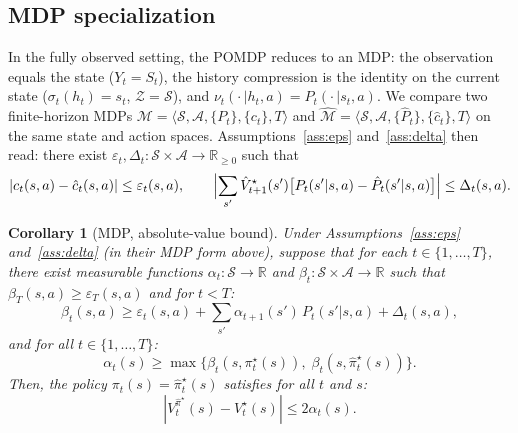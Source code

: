 \documentclass[10pt]{article}
\newtheorem{corollary}{Corollary}
\theoremstyle{definition}
\begin{document}
\subsection*{MDP specialization}

In the fully observed setting, the POMDP reduces to an MDP: the
observation equals the state ($Y_t = S_t$), the history compression is
the identity on the current state ($\sigma_t(h_t) = s_t$,
$\mathcal{Z} = \mathcal{S}$), and
$\nu_t(\cdot\,|h_t, a) = P_t(\cdot\,|s_t, a)$. We compare two
finite-horizon MDPs $\mathcal{M} = \langle \mathcal{S}, \mathcal{A},
\{P_t\}, \{c_t\}, T\rangle$ and $\hat{\mathcal{M}} = \langle
\mathcal{S}, \mathcal{A}, \{\hat P_t\}, \{\hat c_t\}, T\rangle$ on the
same state and action spaces. Assumptions~\ref{ass:eps}
and~\ref{ass:delta} then read: there exist
$\varepsilon_t, \Delta_t : \mathcal{S} \times \mathcal{A} \to
\mathbb{R}_{\ge 0}$ such that
\[
|c_t(s,a) - \hat c_t(s,a)| \le \varepsilon_t(s,a),
\qquad
\Bigl|\sum_{s'} \hat V^\star_{t+1}(s')
\bigl[P_t(s'|s,a) - \hat P_t(s'|s,a)\bigr]\Bigr| \le \Delta_t(s,a).
\]

\begin{corollary}[MDP, absolute-value bound]\label{cor:abs-mdp}
Under Assumptions~\ref{ass:eps} and~\ref{ass:delta} (in their MDP form
above), suppose that for each $t \in \{1, \dots, T\}$, there exist
measurable functions $\alpha_t : \mathcal{S} \to \mathbb{R}$ and
$\beta_t : \mathcal{S} \times \mathcal{A} \to \mathbb{R}$ such that
$\beta_T(s,a) \ge \varepsilon_T(s,a)$ and for $t < T$:
\begin{equation}
\beta_t(s,a) \ge \varepsilon_t(s,a)
+ \sum_{s'} \alpha_{t+1}(s')\, P_t(s'|s,a) + \Delta_t(s,a),
\label{eq:cor-abs-rec}
\end{equation}
and for all $t \in \{1, \dots, T\}$:
\begin{equation}
\alpha_t(s) \ge \max\bigl\{\beta_t(s, \pi^\star_t(s)),\;
\beta_t(s, \hat\pi^\star_t(s))\bigr\}.
\label{eq:cor-abs-anchor}
\end{equation}
Then, the policy $\pi_t(s) = \hat\pi^\star_t(s)$ satisfies for all $t$
and $s$:
\[
|V^{\hat\pi^\star}_t(s) - V^\star_t(s)| \le 2\alpha_t(s).
\]
\end{corollary}
\end{document}

